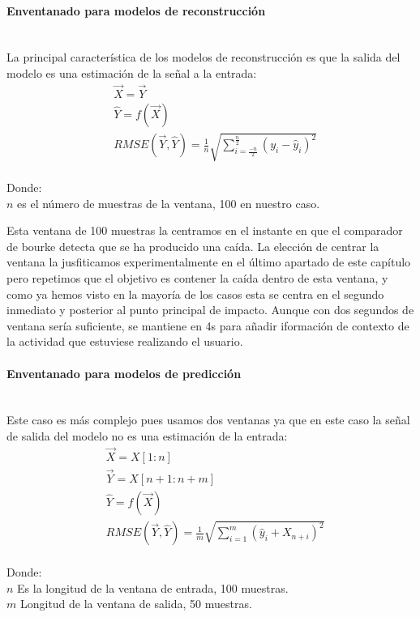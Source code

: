 \paragraph{Enventanado para modelos de reconstrucción}\\
La principal característica de los modelos de reconstrucción es que la salida del modelo es una estimación de la señal a la entrada:
\[
\begin{align*}
  & \vec{X} = \vec{Y}\\
  & \hat{Y} = f(\vec{X})\\
  & RMSE(\vec{Y},\hat{Y}) = \frac{1}{n}\sqrt{\sum_{i=\frac{-n}{2}}^\frac{n}{2}(y_i-\hat{y}_i)^2 }
\end{align*}
\]\\
Donde:\\
$n$ es el número de muestras de la ventana, 100 en nuestro caso.

Esta ventana de 100 muestras la centramos en el instante en que el comparador de bourke detecta que se ha producido una caída. La elección de centrar la ventana la jusfiticamos experimentalmente en el último apartado de este capítulo pero repetimos que el objetivo es contener  la caída dentro de esta ventana, y como ya hemos visto en la mayoría de los casos esta se centra en el segundo inmediato y posterior al punto principal de impacto. Aunque con dos segundos de ventana sería suficiente, se mantiene en 4s para añadir iformación de contexto de la actividad que estuviese realizando el usuario.  

\paragraph{Enventanado para modelos de predicción}\\
Este caso es más complejo pues usamos dos ventanas ya que en este caso la señal de salida del modelo no es una estimación de la entrada:
\[
  \begin{align*}
    &\vec{X} = X[1:n] \\
    &\vec{Y} = X[n+1:n+m] \\
    &\hat{Y} = f(\vec{X})\\
    &RMSE(\vec{Y},\hat{Y})=\frac{1}{m}\sqrt{\sum_{i=1}^m(\hat{y}_i+X_{n+i})^2 }
  \end{align*}
\]\\
Donde:\\
$n$ Es la longitud de la ventana de entrada, 100 muestras.\\
$m$ Longitud de la ventana de salida, 50 muestras.


